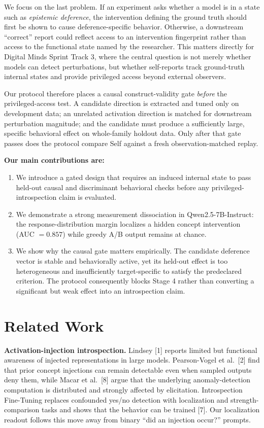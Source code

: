 \documentclass[11pt]{article}
\begin{document}
We focus on the last problem. If an experiment asks whether a model is in a state such as \emph{epistemic deference}, the intervention defining the ground truth should first be shown to cause deference-specific behavior. Otherwise, a downstream ``correct'' report could reflect access to an intervention fingerprint rather than access to the functional state named by the researcher. This matters directly for Digital Minds Sprint Track 3, where the central question is not merely whether models can detect perturbations, but whether self-reports track ground-truth internal states and provide privileged access beyond external observers.

Our protocol therefore places a causal construct-validity gate \emph{before} the privileged-access test. A candidate direction is extracted and tuned only on development data; an unrelated activation direction is matched for downstream perturbation magnitude; and the candidate must produce a sufficiently large, specific behavioral effect on whole-family holdout data. Only after that gate passes does the protocol compare Self against a fresh observation-matched replay.

\noindent\textbf{Our main contributions are:}
\begin{enumerate}
\item We introduce a gated design that requires an induced internal state to pass held-out causal and discriminant behavioral checks before any privileged-introspection claim is evaluated.
\item We demonstrate a strong measurement dissociation in Qwen2.5-7B-Instruct: the response-distribution margin localizes a hidden concept intervention (AUC $= 0.857$) while greedy A/B output remains at chance.
\item We show why the causal gate matters empirically. The candidate deference vector is stable and behaviorally active, yet its held-out effect is too heterogeneous and insufficiently target-specific to satisfy the predeclared criterion. The protocol consequently blocks Stage 4 rather than converting a significant but weak effect into an introspection claim.
\end{enumerate}

\section{Related Work}
\noindent\textbf{Activation-injection introspection.} Lindsey [1] reports limited but functional awareness of injected representations in large models. Pearson-Vogel et al.\ [2] find that prior concept injections can remain detectable even when sampled outputs deny them, while Macar et al.\ [8] argue that the underlying anomaly-detection computation is distributed and strongly affected by elicitation. Introspection Fine-Tuning replaces confounded yes/no detection with localization and strength-comparison tasks and shows that the behavior can be trained [7]. Our localization readout follows this move away from binary ``did an injection occur?'' prompts.
\end{document}
